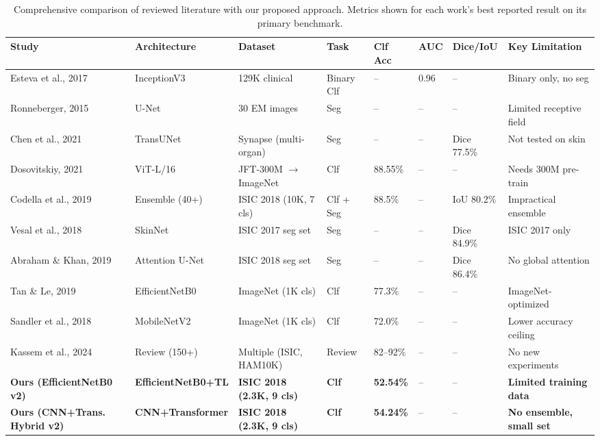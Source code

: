 \documentclass[10pt,twocolumn]{article}
\begin{document}
\begin{table}[t]
\centering
\caption{Comprehensive comparison of reviewed literature with our proposed approach. Metrics shown for each work's best reported result on its primary benchmark.}
\label{tab:lit_comparison}
\small
\begin{tabular}{p{2.4cm}p{2.0cm}p{2.0cm}p{1.4cm}p{1.3cm}p{1.0cm}p{1.2cm}p{2.5cm}}
\toprule
\textbf{Study} & \textbf{Architecture} & \textbf{Dataset} & \textbf{Task} & \textbf{Clf Acc} & \textbf{AUC} & \textbf{Dice/IoU} & \textbf{Key Limitation} \\
\midrule
Esteva et al., 2017 \cite{Esteva2017}      & InceptionV3      & 129K clinical            & Binary Clf & --        & 0.96     & --              & Binary only, no seg \\
Ronneberger, 2015 \cite{Ronneberger2015}   & U-Net            & 30 EM images             & Seg        & --        & --       & --              & Limited receptive field \\
Chen et al., 2021 \cite{ChenTransUNet2021} & TransUNet        & Synapse (multi-organ)    & Seg        & --        & --       & Dice 77.5\%     & Not tested on skin \\
Dosovitskiy, 2021 \cite{Dosovitskiy2021}   & ViT-L/16         & JFT-300M $\rightarrow$ ImageNet & Clf & 88.55\% & -- & -- & Needs 300M pre-train \\
Codella et al., 2019 \cite{Codella2018}    & Ensemble (40+)   & ISIC 2018 (10K, 7 cls)   & Clf + Seg  & 88.5\%    & --       & IoU 80.2\%      & Impractical ensemble \\
Vesal et al., 2018 \cite{Vesal2018}        & SkinNet          & ISIC 2017 seg set        & Seg        & --        & --       & Dice 84.9\%     & ISIC 2017 only \\
Abraham \& Khan, 2019 \cite{Abraham2019}   & Attention U-Net  & ISIC 2018 seg set        & Seg        & --        & --       & Dice 86.4\%     & No global attention \\
Tan \& Le, 2019 \cite{EfficientNet2019}    & EfficientNetB0   & ImageNet (1K cls)        & Clf        & 77.3\%    & --       & --              & ImageNet-optimized \\
Sandler et al., 2018 \cite{MobileNetV2_2018} & MobileNetV2   & ImageNet (1K cls)        & Clf        & 72.0\%    & --       & --              & Lower accuracy ceiling \\
Kassem et al., 2024 \cite{Kassem2024}      & Review (150+)    & Multiple (ISIC, HAM10K)  & Review     & 82--92\%  & --       & --              & No new experiments \\
\midrule
\textbf{Ours (EfficientNetB0 v2)}    & \textbf{EfficientNetB0+TL} & \textbf{ISIC 2018 (2.3K, 9 cls)} & \textbf{Clf} & \textbf{52.54\%} & -- & -- & \textbf{Limited training data} \\
\textbf{Ours (CNN+Trans. Hybrid v2)} & \textbf{CNN+Transformer}   & \textbf{ISIC 2018 (2.3K, 9 cls)} & \textbf{Clf} & \textbf{54.24\%} & -- & -- & \textbf{No ensemble, small set} \\
\bottomrule
\end{tabular}
\end{table}
\end{document}
